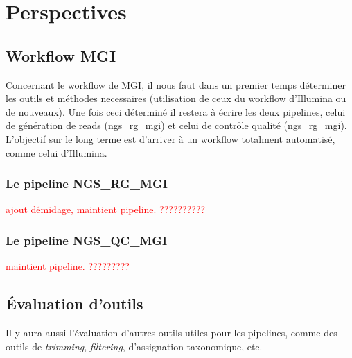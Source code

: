 \section{Perspectives}

\subsection{Workflow MGI}
Concernant le workflow de MGI, il nous faut dans un premier temps déterminer les outils et méthodes necessaires (utilisation de ceux du workflow d'Illumina ou de nouveaux). Une fois ceci déterminé il restera à écrire les deux pipelines, celui de génération de reads (ngs\_rg\_mgi) et celui de contrôle qualité (ngs\_rg\_mgi). L'objectif sur le long terme est d'arriver à un workflow totalment automatisé, comme celui d'Illumina.\\

\subsubsection{Le pipeline NGS\_RG\_MGI}
\textcolor{red}{ajout démidage, maintient pipeline. ??????????}

\subsubsection{Le pipeline NGS\_QC\_MGI}
\textcolor{red}{maintient pipeline. ?????????}

\subsection{Évaluation d'outils}
Il y aura aussi l'évaluation d'autres outils utiles pour les pipelines, comme des outils de \emph{trimming}, \emph{filtering}, d'assignation taxonomique, etc.